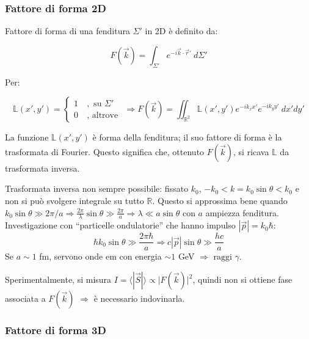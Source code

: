 \documentclass[10pt, a4paper]{scrartcl}
\numberwithin{equation}{subsection}
\theoremstyle{style1}
\newenvironment{boxenv}[1][]{
    \begin{eqbox}[#1]
    }{
   \end{eqbox}
}
\begin{document}
\subsubsection{Fattore di forma 2D}
Fattore di forma di una fenditura $\Sigma' $ in 2D \`e definito da:
\begin{boxenv}[]
\begin{equation}
	F (\vec{k}) = \int_{\Sigma ' } e^{-i \vec{k}\cdot \vec{r}'}  \ d\Sigma '
\end{equation}
\end{boxenv}
\noindent Per:
\begin{boxenv}[]
\begin{equation}
	\mathbb{L}(x',y') = \begin{cases}
		1 \ &, \text{ su } \Sigma '\\
		0 \ & , \text{ altrove } 
	\end{cases} \Rightarrow F(\vec{k}) = \iint_{\mathbb{R}^2} \mathbb{L} (x',y') e^{-ik_x x'} e^{-ik_y y'}  \ dx' dy' 
\end{equation}
\end{boxenv}
\noindent La funzione $\mathbb{L}(x',y') $ \`e forma della fenditura; il suo fattore di forma \`e la trasformata di Fourier. Questo significa che, ottenuto $F(\vec{k})$, si ricava $\mathbb{L}$ da trasformata inversa.

Trasformata inversa non sempre possibile: fissato $k_0$, $-k_0<k=k_0\sin\theta <k_0$ e non si pu\`o svolgere integrale su tutto $\mathbb{R}$. Questo si approssima bene quando $k_0 \sin \theta \gg 2\pi / a \Rightarrow \frac{2\pi}{\lambda }\sin \theta \gg\frac{2\pi}{a }\Rightarrow \lambda \ll a \sin\theta $ con $a $ ampiezza fenditura. Investigazione con ``particelle ondulatorie'' che hanno impulso $|\vec{p}| = k_0 \hbar $:
\[
\hbar k_0 \sin \theta \gg \frac{2\pi \hbar }{a}\Rightarrow c|\vec{p}| \sin \theta \gg \frac{h c}{a}
\] 
Se $a\sim 1$ fm, servono onde em con energia $\sim 1$ GeV $\Rightarrow \text{ raggi } \gamma$.

Sperimentalmente, si misura $I=\langle|\vec{S}|\rangle \propto \lvert F(\vec{k}) \rvert ^2$, quindi non si ottiene fase associata a $F(\vec{k})$ $\Rightarrow $ \`e necessario indovinarla.
\subsubsection{Fattore di forma 3D}
\end{document}
